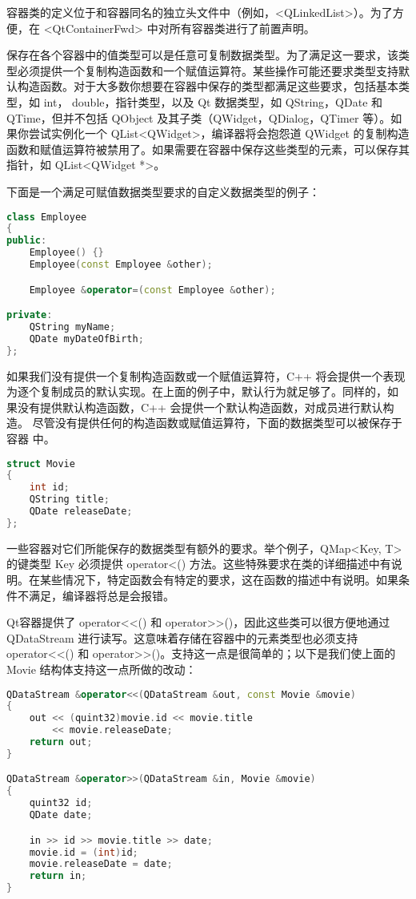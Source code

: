 容器类的定义位于和容器同名的独立头文件中（例如，<QLinkedList>）。为了方便，在 <QtContainerFwd> 中对所有容器类进行了前置声明。

保存在各个容器中的值类型可以是任意可复制数据类型。为了满足这一要求，该类型必须提供一个复制构造函数和一个赋值运算符。某些操作可能还要求类型支持默认构造函数。对于大多数你想要在容器中保存的类型都满足这些要求，包括基本类型，如 int， double，指针类型，以及 Qt 数据类型，如 QString，QDate 和 QTime，但并不包括 QObject 及其子类（QWidget，QDialog，QTimer 等）。如果你尝试实例化一个 QList<QWidget>，编译器将会抱怨道 QWidget 的复制构造函数和赋值运算符被禁用了。如果需要在容器中保存这些类型的元素，可以保存其指针，如 QList<QWidget *>。

下面是一个满足可赋值数据类型要求的自定义数据类型的例子：

\begin{lstlisting}[language=C++]
class Employee
{
public:
    Employee() {}
    Employee(const Employee &other);

    Employee &operator=(const Employee &other);

private:
    QString myName;
    QDate myDateOfBirth;
};
\end{lstlisting}

如果我们没有提供一个复制构造函数或一个赋值运算符，C++ 将会提供一个表现
为逐个复制成员的默认实现。在上面的例子中，默认行为就足够了。同样的，如
果没有提供默认构造函数，C++ 会提供一个默认构造函数，对成员进行默认构造。
尽管没有提供任何的构造函数或赋值运算符，下面的数据类型可以被保存于容器
中。

\begin{lstlisting}[language=C++]
struct Movie
{
    int id;
    QString title;
    QDate releaseDate;
};
\end{lstlisting}

一些容器对它们所能保存的数据类型有额外的要求。举个例子，QMap<Key, T> 的键类型 Key 必须提供 operator<() 方法。这些特殊要求在类的详细描述中有说明。在某些情况下，特定函数会有特定的要求，这在函数的描述中有说明。如果条件不满足，编译器将总是会报错。

Qt容器提供了 operator<<() 和 operator>>()，因此这些类可以很方便地通过
QDataStream 进行读写。这意味着存储在容器中的元素类型也必须支持
operator<<() 和 operator>>()。支持这一点是很简单的；以下是我们使上面的
Movie 结构体支持这一点所做的改动：

\begin{lstlisting}[language=C++]
QDataStream &operator<<(QDataStream &out, const Movie &movie)
{
    out << (quint32)movie.id << movie.title
        << movie.releaseDate;
    return out;
}

QDataStream &operator>>(QDataStream &in, Movie &movie)
{
    quint32 id;
    QDate date;

    in >> id >> movie.title >> date;
    movie.id = (int)id;
    movie.releaseDate = date;
    return in;
}
\end{lstlisting}

